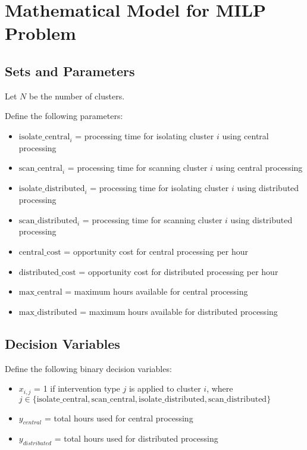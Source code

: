 \documentclass{article}
\begin{document}
\section*{Mathematical Model for MILP Problem}

\subsection*{Sets and Parameters}
Let \( N \) be the number of clusters.

Define the following parameters:
\begin{itemize}
  \item \( \text{isolate\_central}_i \) = processing time for isolating cluster \( i \) using central processing
  \item \( \text{scan\_central}_i \) = processing time for scanning cluster \( i \) using central processing
  \item \( \text{isolate\_distributed}_i \) = processing time for isolating cluster \( i \) using distributed processing
  \item \( \text{scan\_distributed}_i \) = processing time for scanning cluster \( i \) using distributed processing
  \item \( \text{central\_cost} \) = opportunity cost for central processing per hour
  \item \( \text{distributed\_cost} \) = opportunity cost for distributed processing per hour
  \item \( \text{max\_central} \) = maximum hours available for central processing
  \item \( \text{max\_distributed} \) = maximum hours available for distributed processing
\end{itemize}

\subsection*{Decision Variables}
Define the following binary decision variables:
\begin{itemize}
  \item \( x_{i,j} \) = 1 if intervention type \( j \) is applied to cluster \( i \), where \( j \in \{ \text{isolate\_central}, \text{scan\_central}, \text{isolate\_distributed}, \text{scan\_distributed} \} \)
  \item \( y_{central} \) = total hours used for central processing
  \item \( y_{distributed} \) = total hours used for distributed processing
\end{itemize}
\end{document}
